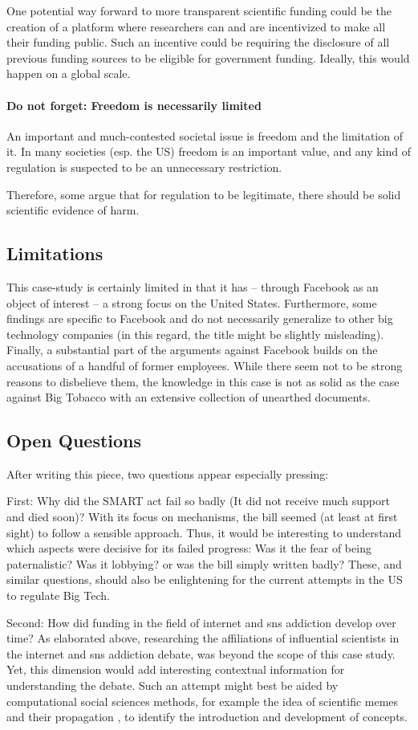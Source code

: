One potential way forward to more transparent scientific funding could be the creation of a platform where researchers can and are incentivized to make all their funding public. Such an incentive could be requiring the disclosure of all previous funding sources to be eligible for government funding.
Ideally, this would happen on a global scale.

\paragraph{Do not forget: Freedom is necessarily limited} An important and much-contested societal issue is freedom and the limitation of it. 
In many societies (esp. the US) freedom is an important value, and any kind of regulation is suspected to be an unnecessary restriction. 


Therefore, some argue that for regulation to be legitimate, there should be solid scientific evidence of harm. 


\subsection{Limitations}
This case-study is certainly limited in that it has -- through Facebook as an object of interest -- a strong focus on the United States. 
Furthermore, some findings are specific to Facebook and do not necessarily generalize to other big technology companies (in this regard, the title might be slightly misleading). 
Finally, a substantial part of the arguments against Facebook builds on the accusations of a handful of former employees.
While there seem not to be strong reasons to disbelieve them, the knowledge in this case is not as solid as the case against Big Tobacco with an extensive collection of unearthed documents.

\subsection{Open Questions}
After writing this piece, two questions appear especially pressing:

First: Why did the SMART act fail so badly (It did not receive much support and died soon)? 
With its focus on mechanisms, the bill seemed (at least at first sight) to follow a sensible approach.
Thus, it would be interesting to understand which aspects were decisive for its failed progress: Was it the fear of being  paternalistic? Was it lobbying? or was the bill simply written badly?
These, and similar questions, should also be enlightening for the current attempts in the US to regulate Big Tech.

Second: How did funding in the field of internet and \gls{sns} addiction develop over time?
As elaborated above, researching the affiliations of influential scientists in the internet and \gls{sns} addiction debate, was beyond the scope of this case study. 
Yet, this dimension would add interesting contextual information for understanding the debate. 
Such an attempt might best be aided by computational social sciences methods, for example the idea of scientific memes and their propagation \citep{kuhn_inheritance_2014}, to identify the introduction and development of concepts. 